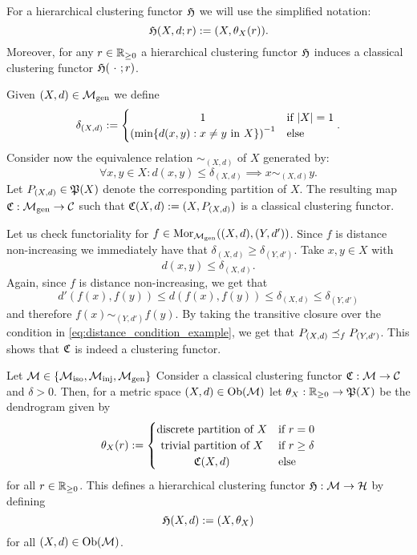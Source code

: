 For a hierarchical clustering functor $\Hf$ we will use the simplified notation:
$$
\Hf(X,d;r) := (X,\theta_X(r)).
$$
Moreover, for any $r \in \R_{\geq0}$ a hierarchical clustering functor $\Hf$ induces a classical clustering functor $\Hf(\ \cdot \ ;r)$.

\begin{example}{\cite[Ex.~6.1]{Carlsson2010}}{}
Given $(X,d) \in \gen$ we define
$$
\delta_{(X,d)} := \begin{cases}
    \hfil 1 & \text{if $|X| = 1$} \\
    \left(\min\{d(x,y): x \neq y \text{ in } X\}\right)^{-1} & \text{else}
\end{cases}.
$$
Consider now the equivalence relation $\sim_{(X,d)}$ of $X$ generated by:
$$
\forall x,y \in X: d(x,y) \leq \delta_{(X,d)} \implies x \sim_{(X,d)} y.
$$
Let $P_{(X,d)} \in \P(X)$ denote the corresponding partition of $X$.
The resulting map $\Cf: \gen \to \C$ such that $\Cf(X,d) := (X, P_{(X,d)})$ is a classical clustering functor.

\medskip
Let us check functoriality for $f \in \mor_\gen((X,d),(Y,d'))$. Since $f$ is distance non-increasing we immediately have that $\delta_{(X,d)} \geq \delta_{(Y,d')}$. Take $x,y \in X$ with
\begin{equation}
    d(x,y) \leq \delta_{(X,d)}.
    \label{eq:distance_condition_example}
\end{equation}
Again, since $f$ is distance non-increasing, we get that
$$
d'(f(x),f(y)) \leq d(f(x),f(y)) \leq \delta_{(X,d)} \leq \delta_{(Y,d')}
$$
and therefore $f(x) \sim_{(Y,d')} f(y)$. By taking the transitive closure over the condition in \eqref{eq:distance_condition_example}, we get that $P_{(X,d)} \refines_f P_{(Y,d')}$.
This shows that $\Cf$ is indeed a clustering functor.
\end{example}

\begin{example}{}{}
Let $\M \in \{\iso, \inj, \gen\}$
Consider a classical clustering functor $\Cf: \M \to \C$ and $\delta > 0$.
Then, for a metric space ${(X,d) \in \ob(\M)}$ let $\theta_X: \R_{\geq0} \to \P(X)$ be the dendrogram given by
$$
\theta_X(r) :=
\begin{cases}
    \text{discrete partition of $X$}& \text{if $r = 0$} \\
    \hfil \text{trivial partition of $X$}& \text{if $r \geq \delta$} \\
    \hfil \Cf(X,d) & \text{else}
\end{cases}
$$
for all $r \in \R_{\geq0}$. 
This defines a hierarchical clustering functor $\Hf: \M \to \H$ by defining
$$
\Hf(X,d) := (X,\theta_X)
$$
for all $(X,d) \in \ob(\M)$.
\end{example}

